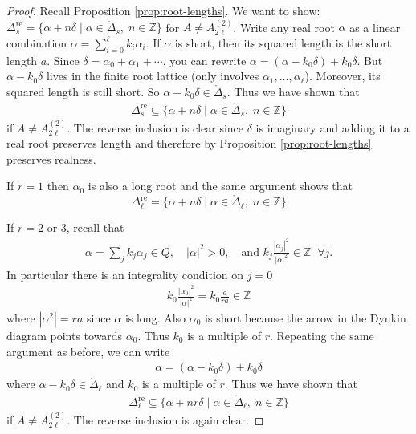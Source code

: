 \documentclass[12pt]{article}
\begin{document}
\begin{proof}
    Recall Proposition \ref{prop:root-lengths}. We want to show: $\Delta^{\mathrm{re}}_s = \{ \alpha+n\delta \mid \alpha \in \mathring{\Delta}_s, \; n\in\mathbb{Z}\}$ for $A\neq A_{2\ell}^{(2)}$. Write any real root $\alpha$ as a linear combination $\alpha=\sum_{i=0}^\ell k_i \alpha_i$. If $\alpha$ is short, then its squared length is the short length $a$. Since $\delta = \alpha_0+\alpha_1+\cdots$, you can rewrite $\alpha = (\alpha - k_0\delta) + k_0\delta$. But $\alpha - k_0\delta$ lives in the finite root lattice (only involves $\alpha_1,\dots,\alpha_\ell$). Moreover, its squared length is still short. So $\alpha - k_0\delta \in \mathring{\Delta}_s$. Thus we have shown that \begin{align*}
        \Delta^{\mathrm{re}}_s \subseteq \{ \alpha+n\delta \mid \alpha \in \mathring{\Delta}_s, \; n\in\mathbb{Z}\}
    \end{align*} if $A\neq A_{2\ell}^{(2)}$. The reverse inclusion is clear since $\delta$ is imaginary and adding it to a real root preserves length and therefore by Proposition \ref{prop:root-lengths} preserves realness.

    If $r=1$ then $\alpha_0$ is also a long root and the same argument shows that \[\Delta^{\mathrm{re}}_\ell = \{ \alpha+n\delta \mid \alpha \in \mathring{\Delta}_\ell, \; n\in\mathbb{Z}\}\]

    If $r = 2$ or $3$, recall that \begin{align*}
        \alpha = \sum_j k_j \alpha_j \in Q, \quad |\alpha|^2 > 0,
        \quad \text{and } k_j\frac{|\alpha_j|^2}{|\alpha|^2} \in \mathbb{Z} \;\; \forall j.
    \end{align*} In particular there is an integrality condition on $j=0$ \begin{align*}
        k_0 \frac{|\alpha_0|^2}{|\alpha|^2} = k_0 \frac{a}{ra} \in \mathbb{Z}
    \end{align*} where $|\alpha^2| = ra$ since $\alpha$ is long. Also $\alpha_0$ is short because the arrow in the Dynkin diagram points towards $\alpha_0$.
    Thus $k_0$ is a multiple of $r$. Repeating the same argument as before, we can write \begin{align*}
        \alpha = (\alpha - k_0\delta) + k_0\delta
    \end{align*} where $\alpha - k_0\delta \in \mathring{\Delta}_\ell$ and $k_0$ is a multiple of $r$. Thus we have shown that \begin{align*}
        \Delta^{\mathrm{re}}_\ell \subseteq \{ \alpha+nr\delta \mid \alpha \in \mathring{\Delta}_\ell, \; n\in\mathbb{Z}\}
    \end{align*} if $A\neq A_{2\ell}^{(2)}$. The reverse inclusion is again clear.
\end{proof}
\end{document}
